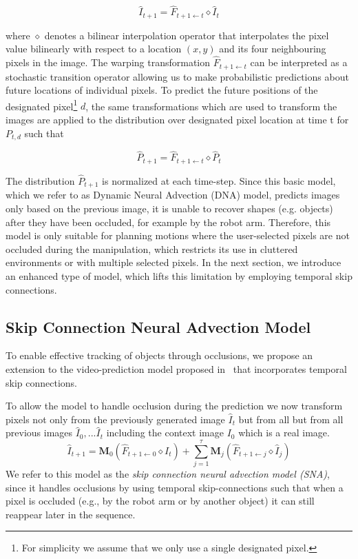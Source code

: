 \begin{equation}
\hat{I}_{t+1} = \hat{F}_{t+1 \leftarrow t} \diamond  \hat{I}_t 
\label{simple_dna}
\end{equation}

where $\diamond$ denotes a bilinear interpolation operator that interpolates the pixel value bilinearly with respect to a location $(x,y)$ and its four neighbouring pixels in the image. The warping transformation $\hat{F}_{t+1 \leftarrow t}$ can be interpreted as a stochastic transition operator allowing us to make probabilistic predictions about future locations of individual pixels. To predict the future positions of the designated pixel\footnote{For simplicity we assume that we only use a single designated pixel.} $d$, the same transformations which are used to transform the images are applied to the distribution over designated pixel location at time t for $P_{t,d}$ such that
 
 \begin{equation}
\hat{P}_{t+1} = \hat{F}_{t+1 \leftarrow t} \diamond  \hat{P}_t
 \label{eqn:prob_forward}
 \end{equation}
 
  The distribution $\hat{P}_{t+1}$ is normalized at each time-step. Since this basic model, which we refer to as Dynamic Neural Advection (DNA) model, predicts images only based on the previous image, it is unable to recover shapes (e.g. objects) after they have been occluded, for example by the robot arm. Therefore, this model is only suitable for planning motions where the user-selected pixels are not occluded during the manipulation, which restricts its use in cluttered environments or with multiple selected pixels. In the next section, we introduce an enhanced type of model, which lifts this limitation by employing temporal skip connections.

\subsection{Skip Connection Neural Advection Model}
\label{subsec:skip}
\label{sec:occlusion_model}
To enable effective tracking of objects through occlusions, we propose an extension to the video-prediction model proposed in~\cite{finn_nips} that incorporates temporal skip connections. 

To allow the model to handle occlusion during the prediction we now transform pixels not only from the previously generated image $\hat{I}_t$ but from all but from all previous images $\hat{I}_0,...\hat{I}_{t}$ including the context image $I_0$ which is a real image. 
\begin{equation}
\hat{I}_{t+1} =  \mathbf{M}_{0} (\hat{F}_{t+1 \leftarrow 0} \diamond I_t) +  \sum_{j=1}^{\tau} \mathbf{M}_{j} (\hat{F}_{t+1 \leftarrow j} \diamond  \hat{I}_j)
\end{equation}
 We refer to this model as the \emph{skip connection neural advection model (SNA)}, since it handles occlusions by using temporal skip-connections such that when a pixel is occluded (e.g., by the robot arm or by another object) it can still reappear later in the sequence.
 
